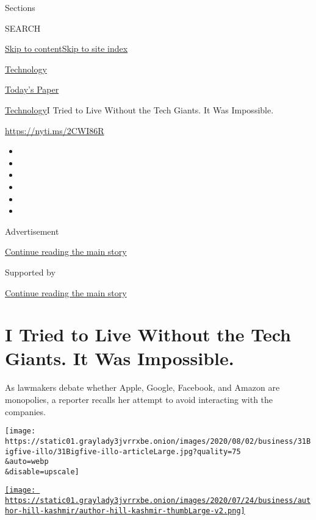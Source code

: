 Sections

SEARCH

\protect\hyperlink{site-content}{Skip to
content}\protect\hyperlink{site-index}{Skip to site index}

\href{https://www.nytimes3xbfgragh.onion/section/technology}{Technology}

\href{https://myaccount.nytimes3xbfgragh.onion/auth/login?response_type=cookie\&client_id=vi}{}

\href{https://www.nytimes3xbfgragh.onion/section/todayspaper}{Today's
Paper}

\href{/section/technology}{Technology}\textbar{}I Tried to Live Without
the Tech Giants. It Was Impossible.

\url{https://nyti.ms/2CWI86R}

\begin{itemize}
\item
\item
\item
\item
\item
\item
\end{itemize}

Advertisement

\protect\hyperlink{after-top}{Continue reading the main story}

Supported by

\protect\hyperlink{after-sponsor}{Continue reading the main story}

\hypertarget{i-tried-to-live-without-the-tech-giants-it-was-impossible}{%
\section{I Tried to Live Without the Tech Giants. It Was
Impossible.}\label{i-tried-to-live-without-the-tech-giants-it-was-impossible}}

As lawmakers debate whether Apple, Google, Facebook, and Amazon are
monopolies, a reporter recalls her attempt to avoid interacting with the
companies.

\texttt{[image: https://static01.graylady3jvrrxbe.onion/images/2020/08/02/business/31Bigfive-illo/31Bigfive-illo-articleLarge.jpg?quality=75\\\&auto=webp\\\&disable=upscale]}

\href{https://www.nytimes3xbfgragh.onion/by/kashmir-hill}{\texttt{[image: https://static01.graylady3jvrrxbe.onion/images/2020/07/24/business/author-hill-kashmir/author-hill-kashmir-thumbLarge-v2.png]}}

